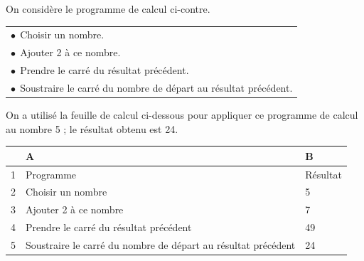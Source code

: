 \documentclass[11pt]{article}
\begin{document}
\medskip

\parbox{0.48\linewidth}{On considère le programme de calcul ci-contre.}\hfill
\parbox{0.48\linewidth}{\begin{tabularx}{\linewidth}{|X|}\hline
$\bullet~~$Choisir un nombre.\\
$\bullet~~$Ajouter 2 à ce nombre.\\
$\bullet~~$Prendre le carré du résultat précédent.\\
$\bullet~~$Soustraire le carré du nombre de départ au résultat précédent.\\ \hline
\end{tabularx}}

\medskip

On a utilisé la feuille de calcul ci-dessous pour appliquer ce programme de calcul au nombre 5 ; le résultat obtenu est 24.

\begin{center}
\begin{tabularx}{\linewidth}{|c|l|X|}\hline
&A&B\\ \hline
1& Programme&Résultat\\ \hline
2& Choisir un nombre &5\\ \hline
3& Ajouter 2 à ce nombre &7\\ \hline
4& Prendre le carré du résultat précédent &49\\ \hline
5& Soustraire le carré du nombre de départ au résultat précédent &24\\ \hline
\end{tabularx}
\end{center}

\smallskip
\end{document}
